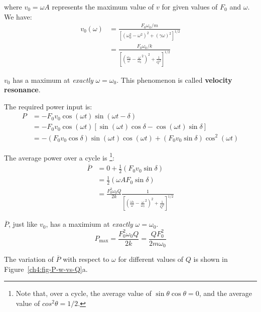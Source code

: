 where $v_0 = \omega A$ represents the maximum value of $v$ for given values of $F_0$ and $\omega$. We have:
\begin{align*}
v_0(\omega) 
&= \frac{F_0\omega_0/m}{[(\omega_0^2 - \omega^2)^2 + (\gamma\omega)^2]^{1/2}} \\
&= \frac{F_0\omega_0/k}{\left[(\frac{\omega_0}{\omega} - \frac{\omega}{\omega_0}^2)^2 + \frac{1}{Q^2} \right]^{1/2}}
\end{align*}

$v_0$ has a maximum at \emph{exactly} $\omega = \omega_0$. This phenomenon is called \textbf{velocity resonance}. 

The required power input is:
\begin{align*}
	P &= -F_0 v_0 \cos(\omega t) \sin(\omega t-\delta) \\
	&= -F_0 v_0 \cos(\omega t) [\sin(\omega t)\cos\delta - \cos(\omega t)\sin\delta] \\
	&= -(F_0 v_0 \cos\delta) \sin(\omega t) \cos(\omega t) + (F_0 v_0 \sin\delta) \cos^2(\omega t)
\end{align*}

The average power over a cycle is%
\footnote{Note that, over a cycle, the average value of $\sin\theta\cos\theta = 0$, and the average value of $cos^2\theta = 1/2.$}:
\begin{align*}
	\overline{P}
	&= 0 + \frac{1}{2} (F_0 v_0 \sin\delta)  \\
	&= \frac{1}{2} (\omega A F_0 \sin\delta)  \\
	&= \frac{F_0^2 \omega_0 Q}{2k}
	\frac{1}{\left[(\frac{\omega_0}{\omega} - \frac{\omega}{\omega_0}^2)^2 + \frac{1}{Q^2} \right]^{1/2}}
\end{align*}

$\overline{P}$, just like $v_0$, has a maximium at \emph{exactly} $\omega = \omega_0$. 
\[ P_\text{max} = \frac{F_0^2\omega_0 Q}{2k} = \frac{QF_0^2}{2m\omega_0}\]

The variation of $\overline{P}$ with respect to $\omega$ for different values of $Q$ is shown in Figure~\ref{ch4:fig-P-w-vs-Q}a.

